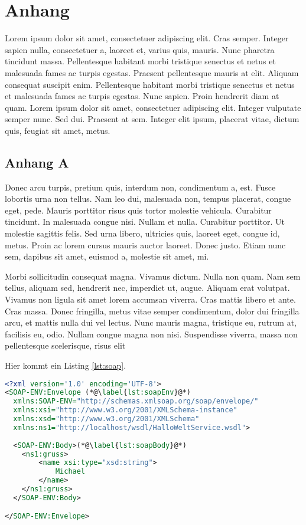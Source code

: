 
\appendix
\chapter{Anhang}
Lorem ipsum dolor sit amet, consectetuer adipiscing elit. Cras semper. Integer sapien nulla, consectetuer a, laoreet et, varius quis, mauris. Nunc pharetra tincidunt massa. Pellentesque habitant morbi tristique senectus et netus et malesuada fames ac turpis egestas. Praesent pellentesque mauris at elit. Aliquam consequat suscipit enim. Pellentesque habitant morbi tristique senectus et netus et malesuada fames ac turpis egestas. Nunc sapien. Proin hendrerit diam at quam. Lorem ipsum dolor sit amet, consectetuer adipiscing elit. Integer vulputate semper nunc. Sed dui. Praesent at sem. Integer elit ipsum, placerat vitae, dictum quis, feugiat sit amet, metus.

\section{Anhang A}
Donec arcu turpis, pretium quis, interdum non, condimentum a, est. Fusce lobortis urna non tellus. Nam leo dui, malesuada non, tempus placerat, congue eget, pede. Mauris porttitor risus quis tortor molestie vehicula. Curabitur tincidunt. In malesuada congue nisi. Nullam et nulla. Curabitur porttitor. Ut molestie sagittis felis. Sed urna libero, ultricies quis, laoreet eget, congue id, metus. Proin ac lorem cursus mauris auctor laoreet. Donec justo. Etiam nunc sem, dapibus sit amet, euismod a, molestie sit amet, mi.

Morbi sollicitudin consequat magna. Vivamus dictum. Nulla non quam. Nam sem tellus, aliquam sed, hendrerit nec, imperdiet ut, augue. Aliquam erat volutpat. Vivamus non ligula sit amet lorem accumsan viverra. Cras mattis libero et ante. Cras massa. Donec fringilla, metus vitae semper condimentum, dolor dui fringilla arcu, et mattis nulla dui vel lectus. Nunc mauris magna, tristique eu, rutrum at, facilisis eu, odio. Nullam congue magna non nisi. Suspendisse viverra, massa non pellentesque scelerisque, risus elit 

\noindent Hier kommt ein Listing \ref{lst:soap}.

\begin{center}
\begin{lstlisting}[caption={SOAP Anfrage an einen HalloWelt-Web-Service},captionpos=b,language=XML,label={lst:soap}]
<?xml version='1.0' encoding='UTF-8'>
<SOAP-ENV:Envelope (*@\label{lst:soapEnv}@*)
  xmlns:SOAP-ENV="http://schemas.xmlsoap.org/soap/envelope/"
  xmlns:xsi="http://www.w3.org/2001/XMLSchema-instance"
  xmlns:xsd="http://www.w3.org/2001/XMLSchema"
  xmlns:ns1="http://localhost/wsdl/HalloWeltService.wsdl">
  
  <SOAP-ENV:Body>(*@\label{lst:soapBody}@*)
  	<ns1:gruss>
  		<name xsi:type="xsd:string">
  			Michael
  		</name>
  	</ns1:gruss>
  </SOAP-ENV:Body>

</SOAP-ENV:Envelope>
\end{lstlisting}
\end{center}

